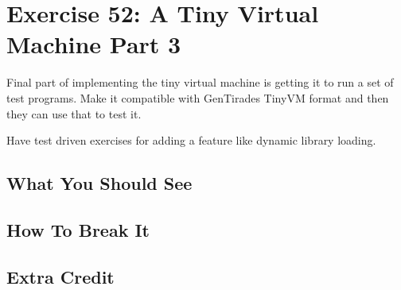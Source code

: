 \chapter{Exercise 52: A Tiny Virtual Machine Part 3}

Final part of implementing the tiny virtual machine is getting it to run a set of 
test programs.  Make it compatible with GenTirades TinyVM format and then they
can use that to test it.

Have test driven exercises for adding a feature like dynamic library loading.


\section{What You Should See}


\section{How To Break It}


\section{Extra Credit}



